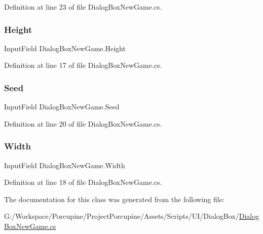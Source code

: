 Definition at line 23 of file Dialog\+Box\+New\+Game.\+cs.

\mbox{\label{class_dialog_box_new_game_a5f8de46895369c12ee755cc7c446a58f}} 
\subsubsection{\texorpdfstring{Height}{Height}}
{\footnotesize\ttfamily Input\+Field Dialog\+Box\+New\+Game.\+Height}



Definition at line 17 of file Dialog\+Box\+New\+Game.\+cs.

\mbox{\label{class_dialog_box_new_game_a19f690bbb7eed35de41c759173515d48}} 
\subsubsection{\texorpdfstring{Seed}{Seed}}
{\footnotesize\ttfamily Input\+Field Dialog\+Box\+New\+Game.\+Seed}



Definition at line 20 of file Dialog\+Box\+New\+Game.\+cs.

\mbox{\label{class_dialog_box_new_game_a8015fa26620431471b2dcdbf5c0ea7f3}} 
\subsubsection{\texorpdfstring{Width}{Width}}
{\footnotesize\ttfamily Input\+Field Dialog\+Box\+New\+Game.\+Width}



Definition at line 18 of file Dialog\+Box\+New\+Game.\+cs.



The documentation for this class was generated from the following file\+:\begin{DoxyCompactItemize}
\item 
G\+:/\+Workspace/\+Porcupine/\+Project\+Porcupine/\+Assets/\+Scripts/\+U\+I/\+Dialog\+Box/\hyperlink{_dialog_box_new_game_8cs}{Dialog\+Box\+New\+Game.\+cs}\end{DoxyCompactItemize}
